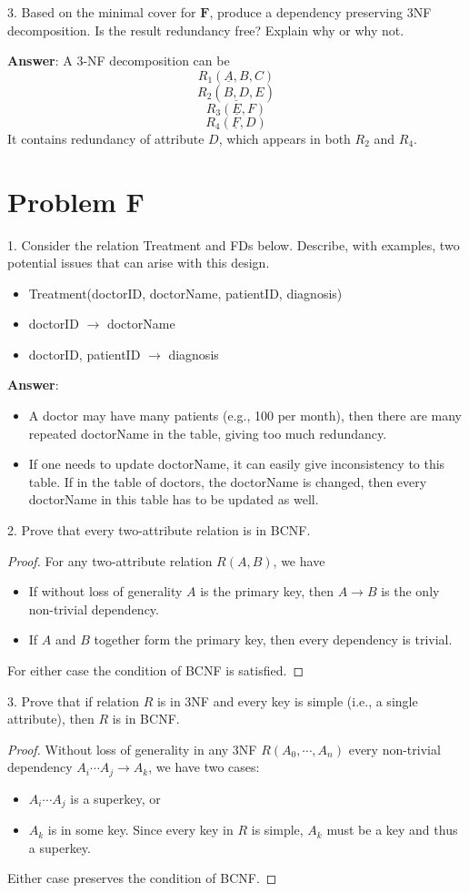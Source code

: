 \documentclass{article}
\begin{document}
3. Based on the minimal cover for $\mathbf{F}$, produce a dependency preserving 3NF decomposition. Is the result redundancy free? Explain why or why not.

{\bf Answer}: A 3-NF decomposition can be
$$R_1 (\underline{A}, B, C)$$
$$R_2 (\underline{B, D}, E)$$
$$R_3 (\underline{E}, F)$$
$$R_4 (\underline{F}, D)$$
It contains redundancy of attribute $D$, which appears in both $R_2$ and $R_4$.

\section{Problem F}
1. Consider the relation Treatment and FDs below. Describe, with examples, two potential issues that can arise with this design.
\begin{itemize}
\item Treatment(doctorID, doctorName, patientID, diagnosis)
\item doctorID $\to$ doctorName
\item doctorID, patientID $\to$ diagnosis
\end{itemize}

{\bf Answer}: 
\begin{itemize}
\item A doctor may have many patients (e.g., 100 per month), then there are many repeated doctorName in the table, giving too much redundancy.
\item If one needs to update doctorName, it can easily give inconsistency to this table. If in the table of doctors, the doctorName is changed, then every doctorName in this table has to be updated as well. 
\end{itemize}

2. Prove that every two-attribute relation is in BCNF.
\begin{proof}
For any two-attribute relation $R(A, B)$, we have
\begin{itemize}
\item If without loss of generality $A$ is the primary key, then $A \to B$ is the only non-trivial dependency. 
\item If $A$ and $B$ together form the primary key, then every dependency is trivial.
\end{itemize}
For either case the condition of BCNF is satisfied.
\end{proof}

3. Prove that if relation $R$ is in 3NF and every key is simple (i.e., a single attribute), then $R$ is in BCNF.
\begin{proof}
Without loss of generality in any 3NF $R(A_0, \cdots, A_n)$ every non-trivial dependency $A_i \cdots A_j \to A_k$, we have two cases:
\begin{itemize}
\item $A_i \cdots A_j$ is a superkey, or
\item $A_k$ is in some key. Since every key in $R$ is simple, $A_k$ must be a key and thus a superkey.
\end{itemize}
Either case preserves the condition of BCNF.
\end{proof}
\end{document}
